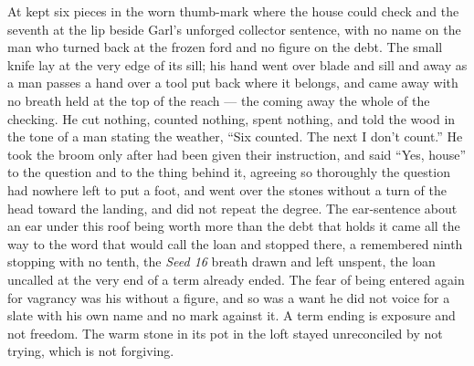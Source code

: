 At   kept six pieces in the worn thumb-mark where the house could check and the seventh at the lip beside Garl's unforged collector sentence, with no name on the man who turned back at the frozen ford and no figure on the debt. The small knife lay at the very edge of its sill; his hand went over blade and sill and away as a man passes a hand over a tool put back where it belongs, and came away with no breath held at the top of the reach --- the coming away the whole of the checking. He cut nothing, counted nothing, spent nothing, and told the wood in the tone of a man stating the weather, “Six counted. The next I don't count.” He took the broom only after  had been given their instruction, and said “Yes, house” to the question and to the thing behind it, agreeing so thoroughly the question had nowhere left to put a foot, and went over the stones without a turn of the head toward the landing, and did not repeat the degree. The ear-sentence about an ear under this roof being worth more than the debt that holds it came all the way to the word that would call the loan and stopped there, a remembered ninth stopping with no tenth, the \emph{Seed 16} breath drawn and left unspent, the loan uncalled at the very end of a term already ended. The fear of being entered again for vagrancy was his without a figure, and so was a want he did not voice for a slate with his own name and no mark against it. A term ending is exposure and not freedom. The warm stone in its pot in the loft stayed unreconciled by not trying, which is not forgiving.

